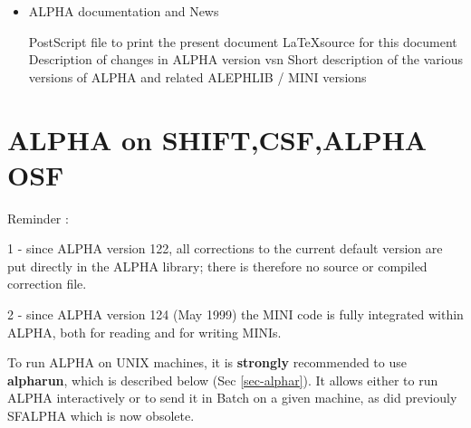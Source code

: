\begin{itemize}
ALPHARUN is invoked directly by typing  alpharun. 
It allows to build  an ALPHA job, either interactive or BATCH, and links
automatically the user's program with all necessary libraries (ALPHA, BOS, ALEPHLIB, JULIA, CERNLIB).

ALPHARUN also facilitates the use of a set of debugger command files which
simplify ALPHA program debugging.
\begin{indentlist}{ 4.75cm}{ 5.00cm}
Standard VAX debug command;
to be used for all
Fortran variables and arrays.
LMHLEN is a parameter and NOT a variable;
use EVA instead of EXA.
Debugger commands are defined for almost all mnemonic
symbols which have one or more arguments (see Ch.
\ref{sec-M}). In
this context,  ``QP'' is a debugger command which has to be
followed by the same argument(s) (given as numbers or
variable names) as the mnemonic symbol QP in Fortran.
\end{indentlist}
 
\item ALPHA documentation and News
\begin{indentlist}{ 2.50cm}{ 2.75cm}
PostScript file to print the present document
\LaTeX source for this document
Description of changes in ALPHA version vsn
Short description of the various versions of ALPHA and related ALEPHLIB / MINI versions
\end{indentlist}
\end{itemize}
 
 
\section{\label{sec-ONUNIX}ALPHA on SHIFT,CSF,ALPHA OSF}
 
 
\par
 Reminder : 

 1 - since ALPHA version 122, all corrections to the current default version are put directly in the ALPHA library;
   there is therefore  no source or compiled correction file.

 2 - since ALPHA version 124 (May 1999) the MINI code is fully integrated within ALPHA, both for reading and for writing MINIs.

\par
To run ALPHA on UNIX machines,
it is {\bf strongly} recommended to use\\ 
{\bf alpharun}, which is described below (Sec \ref{sec-alphar}).
  It allows either to run ALPHA interactively or to send it in Batch on a
given machine, as did previouly SFALPHA which is now obsolete.
 
